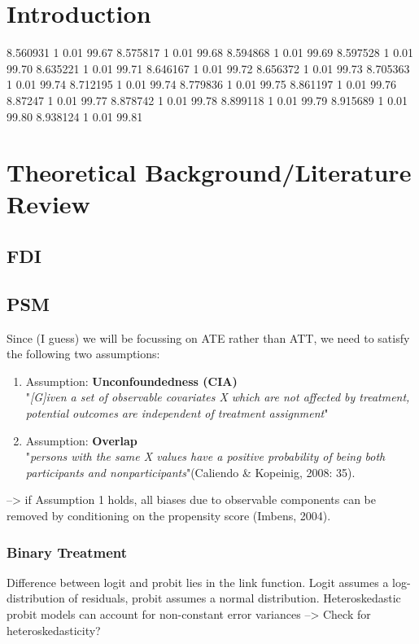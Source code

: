 \documentclass[a4paper,11pt]{scrartcl}
\begin{document}
\section{Introduction}
8.560931		1	0.01	99.67
8.575817		1	0.01	99.68
8.594868		1	0.01	99.69
8.597528		1	0.01	99.70
8.635221		1	0.01	99.71
8.646167		1	0.01	99.72
8.656372		1	0.01	99.73
8.705363		1	0.01	99.74
8.712195		1	0.01	99.74
8.779836		1	0.01	99.75
8.861197		1	0.01	99.76
8.87247			1	0.01	99.77
8.878742		1	0.01	99.78
8.899118		1	0.01	99.79
8.915689		1	0.01	99.80
8.938124		1	0.01	99.81



\section{Theoretical Background/Literature Review}

\subsection{FDI}

\subsection{PSM}
Since (I guess) we will be focussing on ATE rather than ATT, we need to satisfy the following two assumptions: 

\begin{enumerate}
\item Assumption: \textbf{Unconfoundedness (CIA)} \\
"\textit{[G]iven a set of observable covariates X which are not affected by treatment, potential outcomes are independent of treatment assignment}"   \citep[p.~35]{CaliendoHujerThomsen2008}	 

\item Assumption: \textbf{Overlap} \\
"\textit{persons with the same X values have a positive probability of being both participants and nonparticipants}"(Caliendo \& Kopeinig, 2008: 35).

\end{enumerate}
--> if Assumption 1 holds, all biases due to observable components can be removed by conditioning on the propensity score (Imbens, 2004).

\subsubsection*{Binary Treatment}
Difference between logit and probit lies in the link function. Logit assumes a log-distribution of residuals, probit assumes a normal distribution. Heteroskedastic probit models can account for non-constant error variances --> Check for heteroskedasticity?
\end{document}
